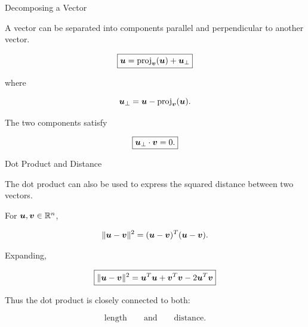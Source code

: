 
\begin{frame}{Decomposing a Vector}

A vector can be separated into components parallel and perpendicular to another vector.

\[
\boxed{
\bm{u}
=
\operatorname{proj}_{\bm{v}}(\bm{u})
+
\bm{u}_{\perp}
}
\]

where

\[
\bm{u}_{\perp}
=
\bm{u}
-
\operatorname{proj}_{\bm{v}}(\bm{u}).
\]

\vspace{0.4cm}

The two components satisfy

\[
\boxed{
\bm{u}_{\perp}\cdot\bm{v}=0.
}
\]

\end{frame}



\begin{frame}{Dot Product and Distance}

The dot product can also be used to express the squared distance between two vectors.

For $\bm{u},\bm{v}\in\mathbb{R}^n$,

\[
\|\bm{u}-\bm{v}\|^2
=
(\bm{u}-\bm{v})^T
(\bm{u}-\bm{v}).
\]

Expanding,

\[
\boxed{
\|\bm{u}-\bm{v}\|^2
=
\bm{u}^T\bm{u}
+
\bm{v}^T\bm{v}
-
2\bm{u}^T\bm{v}
}
\]

Thus the dot product is closely connected to both:

\[
\text{length}
\qquad\text{and}\qquad
\text{distance}.
\]

\end{frame}



